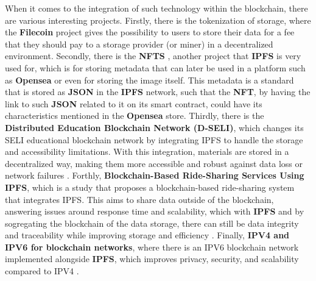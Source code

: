 When it comes to the integration of such technology within the blockchain, there are various interesting projects. Firstly, there is the tokenization of storage, where the \textbf{Filecoin} \cite{filecoin} project gives the possibility to users to store their data for a fee that they should pay to a storage provider (or miner) in a decentralized environment. Secondly, there is the \textbf{NFTS} \cite{nfts}, another project that \textbf{IPFS} is very used for, which is for storing metadata that can later be used in a platform such as \textbf{Opensea} \cite{opensea} or even for storing the image itself. This metadata is a standard that is stored as \textbf{JSON} \cite{json} in the \textbf{IPFS} network, such that the \textbf{NFT}, by having the link to such \textbf{JSON} related to it on its smart contract, could have its characteristics mentioned in the \textbf{Opensea} store. Thirdly, there is the \textbf{Distributed Education Blockchain Network (D-SELI)}, which changes its SELI educational blockchain network by integrating IPFS to handle the storage and accessibility limitations. With this integration, materials are stored in a decentralized way, making them more accessible and robust against data loss or network failures \cite{ipfs-educational-platform}. Forthly, \textbf{Blockchain-Based Ride-Sharing Services Using IPFS}, which is a study that proposes a blockchain-based ride-sharing system that integrates IPFS. This aims to share data outside of the blockchain, answering issues around response time and scalability, which with \textbf{IPFS} and by sogregating the blockchain of the data storage, there can still be data integrity and traceability while improving storage and efficiency \cite{ipfs-sogregate-blockchain-from-storage}. Finally, \textbf{IPV4 and IPV6 for blockchain networks}, where there is an IPV6 blockchain network implemented alongside \textbf{IPFS}, which improves privacy, security, and scalability compared to IPV4 \cite{ipv6-blockchain-networks}.

